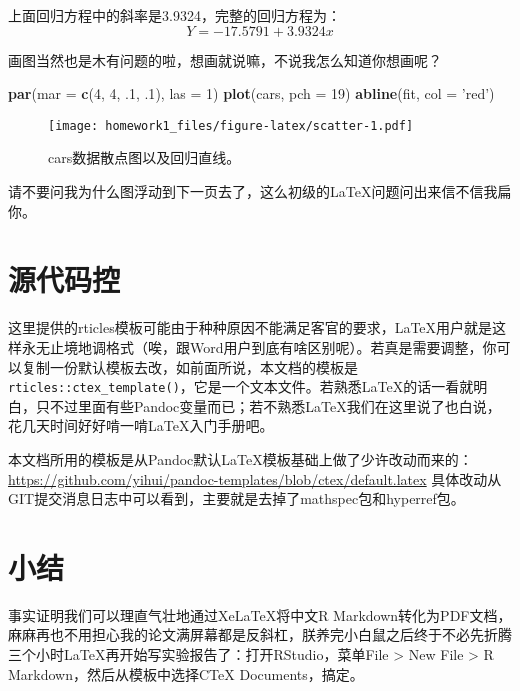 \documentclass[hyperref,]{ctexart}
\newenvironment{Shaded}{\begin{snugshade}}{\end{snugshade}}
\newcommand{\DataTypeTok}[1]{\textcolor[rgb]{0.13,0.29,0.53}{#1}}
\newcommand{\DecValTok}[1]{\textcolor[rgb]{0.00,0.00,0.81}{#1}}
\newcommand{\FloatTok}[1]{\textcolor[rgb]{0.00,0.00,0.81}{#1}}
\newcommand{\KeywordTok}[1]{\textcolor[rgb]{0.13,0.29,0.53}{\textbf{#1}}}
\newcommand{\NormalTok}[1]{#1}
\newcommand{\StringTok}[1]{\textcolor[rgb]{0.31,0.60,0.02}{#1}}
\begin{document}
上面回归方程中的斜率是3.9324，完整的回归方程为：\[ Y = -17.5791 + 3.9324x\]

画图当然也是木有问题的啦，想画就说嘛，不说我怎么知道你想画呢？

\begin{Shaded}
\begin{Highlighting}[]
\KeywordTok{par}\NormalTok{(}\DataTypeTok{mar =} \KeywordTok{c}\NormalTok{(}\DecValTok{4}\NormalTok{, }\DecValTok{4}\NormalTok{, }\FloatTok{.1}\NormalTok{, }\FloatTok{.1}\NormalTok{), }\DataTypeTok{las =} \DecValTok{1}\NormalTok{)}
\KeywordTok{plot}\NormalTok{(cars, }\DataTypeTok{pch =} \DecValTok{19}\NormalTok{)}
\KeywordTok{abline}\NormalTok{(fit, }\DataTypeTok{col =} \StringTok{'red'}\NormalTok{)}
\end{Highlighting}
\end{Shaded}

\begin{figure}
\centering
\texttt{[image: homework1\_files/figure-latex/scatter-1.pdf]}
\caption{cars数据散点图以及回归直线。}
\end{figure}

请不要问我为什么图浮动到下一页去了，这么初级的LaTeX问题问出来信不信我扁你。

\hypertarget{ux6e90ux4ee3ux7801ux63a7}{%
\section{源代码控}\label{ux6e90ux4ee3ux7801ux63a7}}

这里提供的rticles模板可能由于种种原因不能满足客官的要求，LaTeX用户就是这样永无止境地调格式（唉，跟Word用户到底有啥区别呢）。若真是需要调整，你可以复制一份默认模板去改，如前面所说，本文档的模板是\texttt{rticles::ctex\_template()}，它是一个文本文件。若熟悉LaTeX的话一看就明白，只不过里面有些Pandoc变量而已；若不熟悉LaTeX我们在这里说了也白说，花几天时间好好啃一啃LaTeX入门手册吧。

本文档所用的模板是从Pandoc默认LaTeX模板基础上做了少许改动而来的：\url{https://github.com/yihui/pandoc-templates/blob/ctex/default.latex}
具体改动从GIT提交消息日志中可以看到，主要就是去掉了mathspec包和hyperref包。

\hypertarget{ux5c0fux7ed3}{%
\section{小结}\label{ux5c0fux7ed3}}

事实证明我们可以理直气壮地通过XeLaTeX将中文R
Markdown转化为PDF文档，麻麻再也不用担心我的论文满屏幕都是反斜杠，朕养完小白鼠之后终于不必先折腾三个小时LaTeX再开始写实验报告了：打开RStudio，菜单File
\textgreater{} New File \textgreater{} R Markdown，然后从模板中选择CTeX
Documents，搞定。
\end{document}
